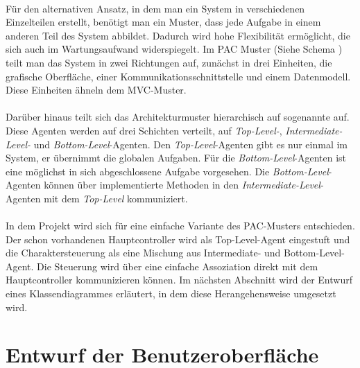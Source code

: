 \paragraph{}
Für den alternativen Ansatz, in dem man ein System in verschiedenen Einzelteilen erstellt, benötigt man ein Muster, dass jede Aufgabe in einem anderen Teil des System abbildet. Dadurch wird hohe Flexibilität ermöglicht, die sich auch im Wartungsaufwand widerspiegelt.
Im PAC Muster (Siehe Schema ) teilt man das System in zwei Richtungen auf, zunächst in drei Einheiten, die grafische Oberfläche, einer Kommunikationsschnittstelle und einem Datenmodell. Diese Einheiten ähneln dem MVC-Muster.
\paragraph{}
Darüber hinaus teilt sich das Architekturmuster hierarchisch auf sogenannte  auf.
Diese Agenten werden auf drei Schichten verteilt, auf \textit{Top-Level-}, \textit{Intermediate-Level-} und \textit{Bottom-Level}-Agenten. Den \textit{Top-Level}-Agenten gibt es nur einmal im System, er übernimmt die globalen Aufgaben. Für die \textit{Bottom-Level}-Agenten ist eine möglichst in sich abgeschlossene Aufgabe vorgesehen. Die \textit{Bottom-Level}-Agenten können über implementierte Methoden in den \textit{Intermediate-Level}-Agenten mit dem \textit{Top-Level} kommuniziert.
\paragraph{}
In dem Projekt wird sich für eine einfache Variante des PAC-Musters entschieden. Der schon vorhandenen Hauptcontroller wird als Top-Level-Agent eingestuft und die Charaktersteuerung als eine Mischung aus Intermediate- und Bottom-Level-Agent. Die Steuerung wird über eine einfache Assoziation direkt mit dem Hauptcontroller kommunizieren können. Im nächsten Abschnitt wird der Entwurf eines Klassendiagrammes erläutert, in dem diese Herangehensweise umgesetzt wird.

\section{Entwurf der Benutzeroberfläche}
